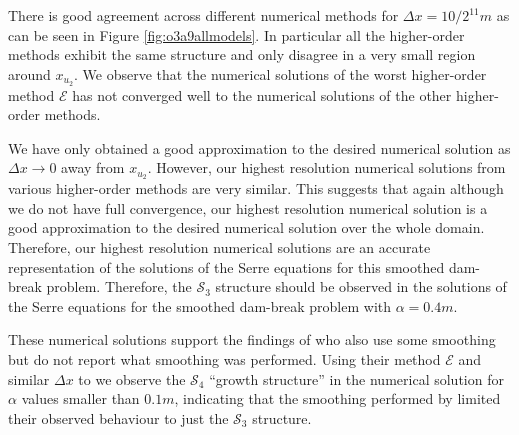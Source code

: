 \documentclass[times]{elsarticle}
\begin{document}
There is good agreement across different numerical methods for $\Delta x = 10/2^{11}m$ as can be seen in Figure \ref{fig:o3a9allmodels}. In particular all the higher-order methods exhibit the same structure and only disagree in a very small region around $x_{u_2}$. We observe that the numerical solutions of the worst higher-order method $\mathcal{E}$ has not converged well to the numerical solutions of the other higher-order methods. 

We have only obtained a good approximation to the desired numerical solution as $\Delta x \rightarrow 0$ away from $x_{u_2}$. However, our highest resolution numerical solutions from various higher-order methods are very similar. This suggests that again although we do not have full convergence, our highest resolution numerical solution is a good approximation to the desired numerical solution over the whole domain. Therefore, our highest resolution numerical solutions are an accurate representation of the solutions of the Serre equations for this smoothed dam-break problem. Therefore, the $\mathcal{S}_3$ structure should be observed in the solutions of the Serre equations for the smoothed dam-break problem with $\alpha = 0.4m$.

These numerical solutions support the findings of \citet{El-etal-2006} who also use some smoothing \cite{El-Hoefer-2016-11} but do not report what smoothing was performed. Using their method $\mathcal{E}$ and similar $\Delta x$ to \citet{El-etal-2006} we observe the $\mathcal{S}_4$ ``growth structure'' in the numerical solution for $\alpha$ values smaller than $0.1m$, indicating that the smoothing performed by \citet{El-etal-2006} limited their observed behaviour to just the $\mathcal{S}_3$ structure. 
\end{document}

